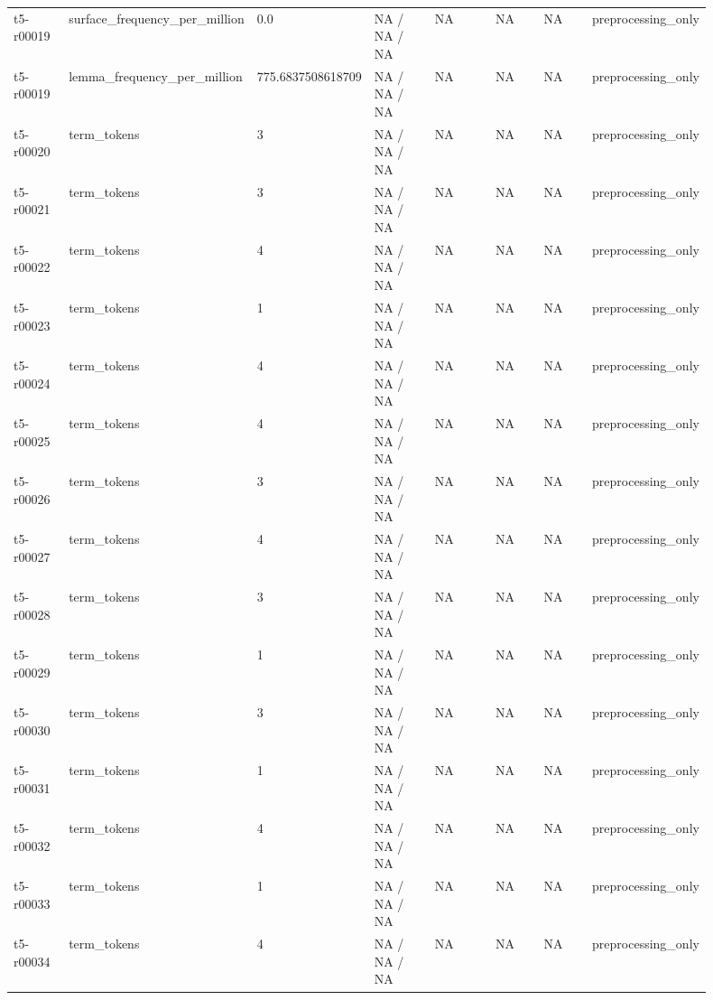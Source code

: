 \begin{longtable}{@{}p{0.09\linewidth}p{0.14\linewidth}p{0.08\linewidth}p{0.14\linewidth}p{0.14\linewidth}p{0.1\linewidth}p{0.1\linewidth}p{0.11\linewidth}@{}}
t5-r00019 & surface\_\allowbreak{}frequency\_\allowbreak{}per\_\allowbreak{}million & 0.0 & NA / NA / NA & NA & NA & NA & preprocessing\_\allowbreak{}only \\
t5-r00019 & lemma\_\allowbreak{}frequency\_\allowbreak{}per\_\allowbreak{}million & 775.6837508618709 & NA / NA / NA & NA & NA & NA & preprocessing\_\allowbreak{}only \\
t5-r00020 & term\_\allowbreak{}tokens & 3 & NA / NA / NA & NA & NA & NA & preprocessing\_\allowbreak{}only \\
t5-r00021 & term\_\allowbreak{}tokens & 3 & NA / NA / NA & NA & NA & NA & preprocessing\_\allowbreak{}only \\
t5-r00022 & term\_\allowbreak{}tokens & 4 & NA / NA / NA & NA & NA & NA & preprocessing\_\allowbreak{}only \\
t5-r00023 & term\_\allowbreak{}tokens & 1 & NA / NA / NA & NA & NA & NA & preprocessing\_\allowbreak{}only \\
t5-r00024 & term\_\allowbreak{}tokens & 4 & NA / NA / NA & NA & NA & NA & preprocessing\_\allowbreak{}only \\
t5-r00025 & term\_\allowbreak{}tokens & 4 & NA / NA / NA & NA & NA & NA & preprocessing\_\allowbreak{}only \\
t5-r00026 & term\_\allowbreak{}tokens & 3 & NA / NA / NA & NA & NA & NA & preprocessing\_\allowbreak{}only \\
t5-r00027 & term\_\allowbreak{}tokens & 4 & NA / NA / NA & NA & NA & NA & preprocessing\_\allowbreak{}only \\
t5-r00028 & term\_\allowbreak{}tokens & 3 & NA / NA / NA & NA & NA & NA & preprocessing\_\allowbreak{}only \\
t5-r00029 & term\_\allowbreak{}tokens & 1 & NA / NA / NA & NA & NA & NA & preprocessing\_\allowbreak{}only \\
t5-r00030 & term\_\allowbreak{}tokens & 3 & NA / NA / NA & NA & NA & NA & preprocessing\_\allowbreak{}only \\
t5-r00031 & term\_\allowbreak{}tokens & 1 & NA / NA / NA & NA & NA & NA & preprocessing\_\allowbreak{}only \\
t5-r00032 & term\_\allowbreak{}tokens & 4 & NA / NA / NA & NA & NA & NA & preprocessing\_\allowbreak{}only \\
t5-r00033 & term\_\allowbreak{}tokens & 1 & NA / NA / NA & NA & NA & NA & preprocessing\_\allowbreak{}only \\
t5-r00034 & term\_\allowbreak{}tokens & 4 & NA / NA / NA & NA & NA & NA & preprocessing\_\allowbreak{}only \\

\end{longtable}
